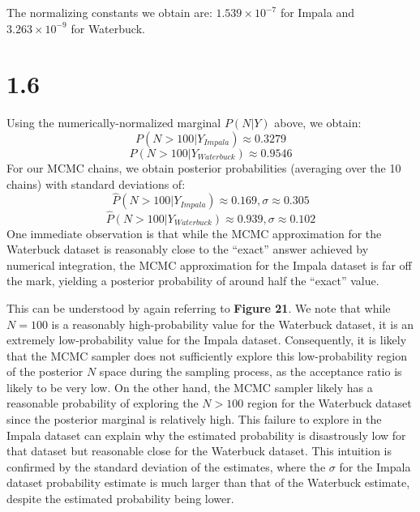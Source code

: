 \documentclass[10pt,psamsfonts]{amsart}
\theoremstyle{definition}
\theoremstyle{remark}
\numberwithin{equation}{section}
\begin{document}
The normalizing constants we obtain are: $1.539\times 10^{-7}$ for Impala and $3.263\times 10^{-9}$ for Waterbuck.

\section*{1.6}

Using the numerically-normalized marginal $P(N|Y)$ above, we obtain:
$$P(N > 100|Y_{Impala}) \approx 0.3279$$
$$P(N > 100|Y_{Waterbuck}) \approx 0.9546$$
For our MCMC chains, we obtain posterior probabilities (averaging over the 10 chains) with standard deviations of:
$$\hat{P}(N>100|Y_{Impala}) \approx 0.169, \sigma \approx 0.305$$
$$\hat{P}(N>100|Y_{Waterbuck}) \approx 0.939, \sigma \approx 0.102$$
One immediate observation is that while the MCMC approximation for the Waterbuck dataset is reasonably close to the ``exact'' answer achieved by numerical integration, the MCMC approximation for the Impala dataset is far off the mark, yielding a posterior probability of around half the ``exact'' value.

This can be understood by again referring to {\bf Figure 21}. We note that while $N = 100$ is a reasonably high-probability value for the Waterbuck dataset, it is an extremely low-probability value for the Impala dataset. Consequently, it is likely that the MCMC sampler does not sufficiently explore this low-probability region of the posterior $N$ space during the sampling process, as the acceptance ratio is likely to be very low. On the other hand, the MCMC sampler likely has a reasonable probability of exploring the $N > 100$ region for the Waterbuck dataset since the posterior marginal is relatively high. This failure to explore in the Impala dataset can explain why the estimated probability is disastrously low for that dataset but reasonable close for the Waterbuck dataset. This intuition is confirmed by the standard deviation of the estimates, where the $\sigma$ for the Impala dataset probability estimate is much larger than that of the Waterbuck estimate, despite the estimated probability being lower.
\end{document}
